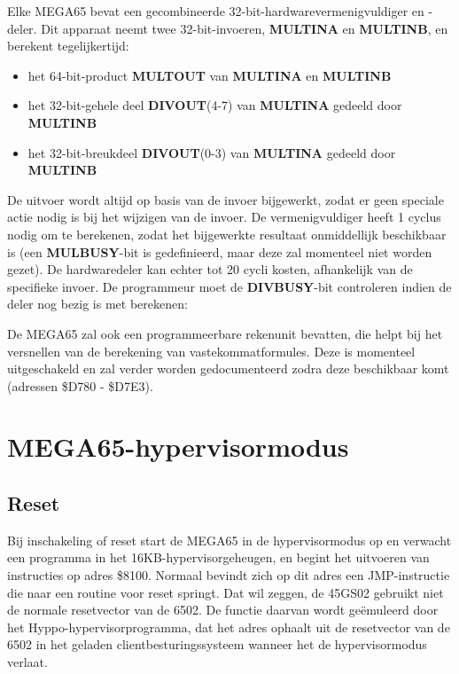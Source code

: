 Elke MEGA65 bevat een gecombineerde 32-bit-hardwarevermenigvuldiger en -deler. Dit apparaat neemt twee 32-bit-invoeren, {\bf MULTINA} en {\bf MULTINB}, en berekent tegelijkertijd:

\begin{itemize}
\item het 64-bit-product {\bf MULTOUT} van {\bf MULTINA} en {\bf MULTINB}\item het 32-bit-gehele deel {\bf DIVOUT}(4-7) van {\bf MULTINA} gedeeld door {\bf MULTINB}\item het 32-bit-breukdeel {\bf DIVOUT}(0-3) van {\bf MULTINA} gedeeld door {\bf MULTINB}
\end{itemize}

De uitvoer wordt altijd op basis van de invoer bijgewerkt, zodat er geen speciale actie nodig is bij het wijzigen van de invoer. De vermenigvuldiger heeft 1 cyclus nodig om te berekenen, zodat het bijgewerkte resultaat onmiddellijk beschikbaar is (een {\bf MULBUSY}-bit is gedefinieerd, maar deze zal momenteel niet worden gezet). De hardwaredeler kan echter tot 20 cycli kosten, afhankelijk van de specifieke invoer. De programmeur moet de {\bf DIVBUSY}-bit controleren indien de deler nog bezig is met berekenen:


De MEGA65 zal ook een programmeerbare rekenunit bevatten, die helpt bij het versnellen van de berekening van vastekommatformules. Deze is momenteel uitgeschakeld en zal verder worden gedocumenteerd zodra deze beschikbaar komt (adressen \$D780 - \$D7E3).



\section{MEGA65-hypervisormodus}
\label{sec:hypervisor-mode}

\subsection{Reset}

Bij inschakeling of reset start de MEGA65 in de hypervisormodus op en verwacht een programma in het 16KB-hypervisorgeheugen, en begint het uitvoeren van instructies op adres \$8100. Normaal bevindt zich op dit adres een JMP-instructie die naar een routine voor reset springt. Dat wil zeggen, de 45GS02 gebruikt niet de normale resetvector van de 6502. De functie daarvan wordt geëmuleerd door het Hyppo-hypervisorprogramma, dat het adres ophaalt uit de resetvector van de 6502 in het geladen clientbesturingssysteem wanneer het de hypervisormodus verlaat.

